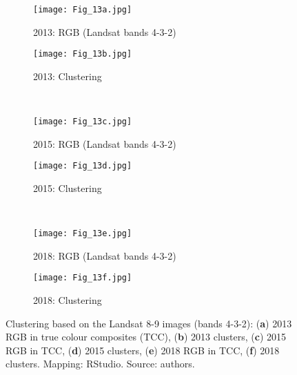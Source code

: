 \documentclass[12pt,a4paper,oneside]{article}
\begin{document}
\begin{figure}[H]
	\begin{subfigure}[b]{.5\textwidth}
		\centering
			\texttt{[image: Fig\_13a.jpg]}
		\caption{2013: RGB (Landsat bands 4-3-2)}
	\end{subfigure}%
	\begin{subfigure}[b]{.5\textwidth}
		\centering
		\texttt{[image: Fig\_13b.jpg]}
		\caption{2013: Clustering}
	\end{subfigure}%
\\
\vfill \vspace{1mm}
	\begin{subfigure}[b]{.5\textwidth}
		\centering
			\texttt{[image: Fig\_13c.jpg]}
		\caption{2015: RGB (Landsat bands 4-3-2)}
	\end{subfigure}%
	\begin{subfigure}[b]{.5\textwidth}
		\centering
		\texttt{[image: Fig\_13d.jpg]}
		\caption{2015: Clustering}
	\end{subfigure}%
\\
\vfill \vspace{1mm}
	\begin{subfigure}[b]{.5\textwidth}
		\centering
			\texttt{[image: Fig\_13e.jpg]}
		\caption{2018: RGB (Landsat bands 4-3-2)}
	\end{subfigure}%
	\begin{subfigure}[b]{.5\textwidth}
		\centering
		\texttt{[image: Fig\_13f.jpg]}
		\caption{2018: Clustering}
	\end{subfigure}%
\vspace*{20pt}\caption{Clustering based on the Landsat 8-9 images (bands 4-3-2): (\textbf{a}) 2013 RGB in true colour composites (TCC), (\textbf{b}) 2013 clusters, (\textbf{c}) 2015 RGB in TCC, (\textbf{d}) 2015 clusters, (\textbf{e}) 2018 RGB in TCC, (\textbf{f}) 2018 clusters. Mapping: RStudio. Source: authors.}\label{fig13}
\end{figure}
\end{document}
